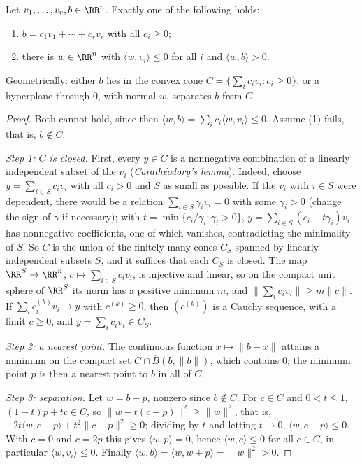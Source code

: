 \begin{lemma}[Farkas]\label{real-analysis:lemma-farkas}
Let $v_1, \ldots, v_r, b \in \RR^n$. Exactly one of the following holds:
\begin{enumerate}
\item $b = c_1v_1 + \cdots + c_rv_r$ with all $c_i \geq 0$;
\item there is $w \in \RR^n$ with $\langle w, v_i\rangle \leq 0$ for all $i$ and $\langle w, b\rangle > 0$.
\end{enumerate}
\end{lemma}

Geometrically: either $b$ lies in the convex cone $C = \{\sum_ic_iv_i : c_i \geq 0\}$, or a hyperplane through $0$, with normal $w$, separates $b$ from $C$.

\begin{proof}
Both cannot hold, since then $\langle w, b\rangle = \sum_ic_i\langle w, v_i\rangle \leq 0$. Assume (1) fails, that is, $b \notin C$.

\emph{Step 1: $C$ is closed.} First, every $y \in C$ is a nonnegative combination of a linearly independent subset of the $v_i$ (\emph{Carath\'eodory's lemma}). Indeed, choose
$y = \sum_{i \in S}c_iv_i$ with all $c_i > 0$ and $S$ as small as possible. If the $v_i$ with $i \in S$ were dependent, there would be a relation $\sum_{i \in S}\gamma_iv_i = 0$ with some $\gamma_i > 0$
(change the sign of $\gamma$ if necessary); with $t = \min\{c_i/\gamma_i : \gamma_i > 0\}$, $y = \sum_{i \in S}(c_i - t\gamma_i)v_i$ has nonnegative coefficients, one of which vanishes, contradicting the
minimality of $S$. So $C$ is the union of the finitely many cones $C_S$ spanned by linearly independent subsets $S$, and it suffices that each $C_S$ is closed. The map $\RR^S \to \RR^n$,
$c \mapsto \sum_{i \in S}c_iv_i$, is injective and linear, so on the compact unit sphere of $\RR^S$ its norm has a positive minimum $m$, and $\|\sum_ic_iv_i\| \geq m\|c\|$. If
$\sum_ic_i^{(k)}v_i \to y$ with $c^{(k)} \geq 0$, then $(c^{(k)})$ is a Cauchy sequence, with a limit $c \geq 0$, and $y = \sum_ic_iv_i \in C_S$.

\emph{Step 2: a nearest point.} The continuous function $x \mapsto \|b - x\|$ attains a minimum on the compact set $C \cap \overline{B}(b, \|b\|)$, which contains $0$; the minimum point $p$ is then a
nearest point to $b$ in all of $C$.

\emph{Step 3: separation.} Let $w = b - p$, nonzero since $b \notin C$. For $c \in C$ and $0 < t \leq 1$, $(1 - t)p + tc \in C$, so
$\|w - t(c - p)\|^2 \geq \|w\|^2$, that is, $-2t\langle w, c - p\rangle + t^2\|c - p\|^2 \geq 0$; dividing by $t$ and letting $t \to 0$, $\langle w, c - p\rangle \leq 0$. With $c = 0$ and $c = 2p$ this gives
$\langle w, p\rangle = 0$, hence $\langle w, c\rangle \leq 0$ for all $c \in C$, in particular $\langle w, v_i\rangle \leq 0$. Finally $\langle w, b\rangle = \langle w, w + p\rangle = \|w\|^2 > 0$.
\end{proof}

